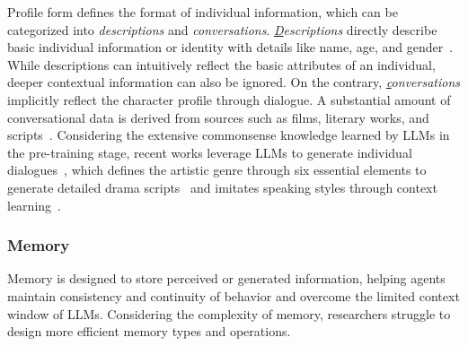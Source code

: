 Profile form defines the format of individual information, which can be categorized into  \textit{descriptions} and \textit{conversations}.
\textit{{\ul Descriptions}} directly describe basic individual information or identity with details like name, age, and gender~\cite{jang2022customizedconversationcustomizedconversation,wang2023humanoidagentsplatformsimulating}. While descriptions can intuitively reflect the basic attributes of an individual, deeper contextual information can also be ignored.
On the contrary, \textit{{\ul conversations}} implicitly reflect the character profile through dialogue.
A substantial amount of conversational data is derived from sources such as films, literary works, and scripts~\cite{li2021dialoguehistorymatterspersonalized,brahman2021letcharacterstellstory,jandaghi2023faithfulpersonabasedconversationaldataset,yu2024dialogueprofiledialoguealignmentframework}. 
Considering the extensive commonsense knowledge learned by LLMs in the pre-training stage, recent works leverage LLMs to generate individual dialogues~\cite{li2023chatharuhirevivinganimecharacter,ge2024scalingsyntheticdatacreation}, which defines the artistic genre through six essential elements to generate detailed drama scripts~\cite{wu2024roleplaydramainteractionllmsolution} and imitates speaking styles through context learning~\cite{wang2024rolellmbenchmarkingelicitingenhancing,yu2024neekoleveragingdynamiclora}.


\subsubsection{Memory}
Memory is designed to store perceived or generated information, helping agents maintain consistency and continuity of behavior and overcome the limited context window of LLMs. Considering the complexity of memory, researchers struggle to design more efficient memory types and operations.

